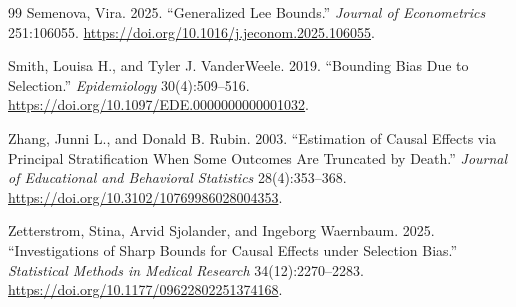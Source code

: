 \documentclass[11pt]{article}
\theoremstyle{definition}
\theoremstyle{plain}
\theoremstyle{remark}
\begin{document}
\begin{thebibliography}{99}
Semenova, Vira. 2025. ``Generalized Lee Bounds.'' \emph{Journal of Econometrics} 251:106055. \url{https://doi.org/10.1016/j.jeconom.2025.106055}.

Smith, Louisa H., and Tyler J. VanderWeele. 2019. ``Bounding Bias Due to Selection.'' \emph{Epidemiology} 30(4):509--516. \url{https://doi.org/10.1097/EDE.0000000000001032}.

Zhang, Junni L., and Donald B. Rubin. 2003. ``Estimation of Causal Effects via Principal Stratification When Some Outcomes Are Truncated by Death.'' \emph{Journal of Educational and Behavioral Statistics} 28(4):353--368. \url{https://doi.org/10.3102/10769986028004353}.

Zetterstrom, Stina, Arvid Sjolander, and Ingeborg Waernbaum. 2025. ``Investigations of Sharp Bounds for Causal Effects under Selection Bias.'' \emph{Statistical Methods in Medical Research} 34(12):2270--2283. \url{https://doi.org/10.1177/09622802251374168}.
\end{thebibliography}
\end{document}
